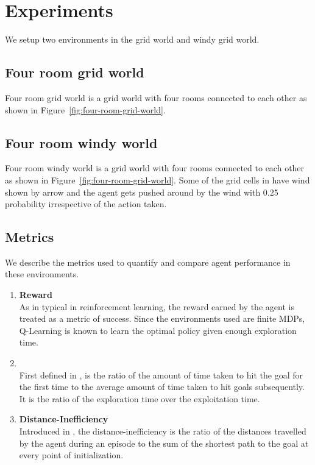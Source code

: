 \section{Experiments}
We setup two environments in the grid world and windy grid world.

\subsection{Four room grid world}
Four room grid world is a grid world with four rooms connected to each other as shown in Figure~\ref{fig:four-room-grid-world}.

\subsection{Four room windy world}

Four room windy world is a grid world with four rooms connected to each other as shown in Figure~\ref{fig:four-room-grid-world}.
Some of the grid cells in have wind shown by arrow and the agent gets pushed around by
the wind with 0.25 probability irrespective of the action taken.

\subsection{Metrics}
We describe the metrics used to quantify and compare agent performance
in these environments.

\begin{enumerate}
    \item \textbf{Reward}\\\noindent
        As in typical in reinforcement learning, the reward earned by
        the agent is treated as a metric of success. Since the
        environments used are finite MDPs, Q-Learning is known to learn
        the optimal policy given enough exploration time. 

    \item \textbf{\Loo}\\
        First defined in \cite{MiPaViICLR2017}, \Loo is the ratio of the
        amount of time taken to hit the goal for the first time to the
        average amount of time taken to hit goals subsequently. It is
        the ratio of the exploration time over the exploitation time. 

    \item \textbf{Distance-Inefficiency}\\
        Introduced in \cite{dhiman2018critical}, the
        distance-inefficiency is the ratio of the distances travelled by
        the agent during an episode to the sum of the shortest path to
        the goal at every point of initialization. 
\end{enumerate}


